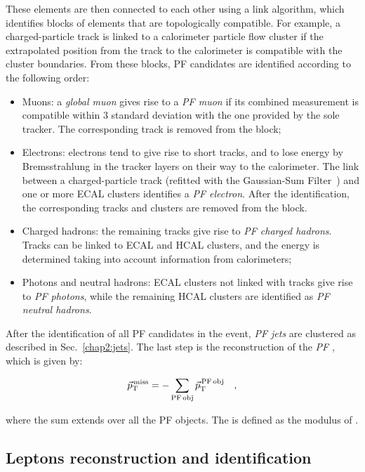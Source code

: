 These elements are then connected to each other using a link algorithm, which identifies blocks of elements that are topologically compatible. For example, a charged-particle track is linked to a calorimeter particle flow cluster if the extrapolated position from the track to the calorimeter is compatible with the cluster boundaries. From these blocks, PF candidates are identified according to the following order:
\begin{itemize}
\item Muons: a \emph{global muon} gives rise to a \emph{PF muon} if its combined \pt measurement is compatible within 3 standard deviation with the one provided by the sole tracker. The corresponding track is removed from the block;
\item Electrons: electrons tend to give rise to short tracks, and to lose energy by Bremsstrahlung in the tracker layers on their way to the calorimeter. The link between a charged-particle track (refitted with the Gaussian-Sum Filter~\cite{Adam:815410}) and one or more ECAL clusters identifies a \emph{PF electron}. After the identification, the corresponding tracks and clusters are removed from the block.
\item Charged hadrons: the remaining tracks give rise to \emph{PF charged hadrons}. Tracks can be linked to ECAL and HCAL clusters, and the energy is determined taking into account information from calorimeters;
\item Photons and neutral hadrons: ECAL clusters not linked with tracks give rise to \emph{PF photons}, while the remaining HCAL clusters are identified as \emph{PF neutral hadrons}.
\end{itemize}
After the identification of all PF candidates in the event, \emph{PF jets} are clustered as described in Sec.~\ref{chap2:jets}. The last step is the reconstruction of the \emph{PF \ptmiss}, which is given by:

\begin{equation} 
\vec{p}_\mathrm{T}^\mathrm{\,miss} = - \sum_{\mathrm{PF\,obj}} \vec{p}_\mathrm{T}^\mathrm{\,PF\,obj} \quad,
\end{equation}

where the sum extends over all the PF objects. The \MET is defined as the modulus of \ptmiss.

\subsection{Leptons reconstruction and identification}

